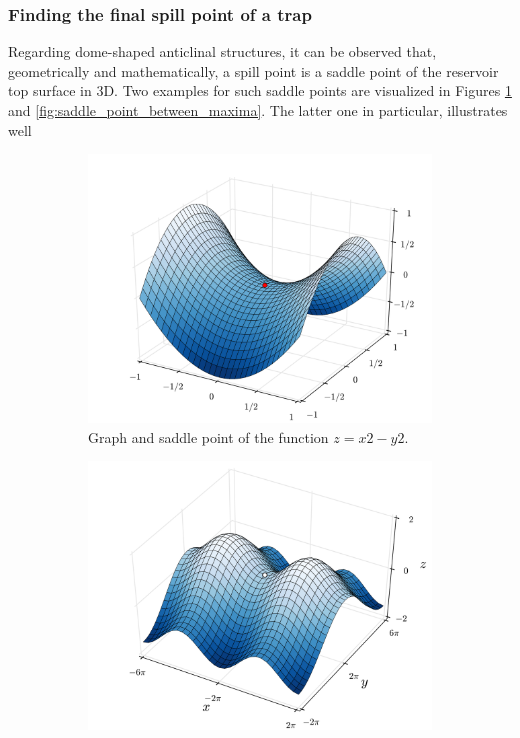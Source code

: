 			\subsubsection{Finding the final spill point of a trap} %
			Regarding dome-shaped anticlinal structures, it can be observed that, geometrically and mathematically, a spill point is a saddle point of the reservoir top surface in 3D. Two examples for such saddle points are visualized in Figures \ref{fig:saddle_point} and \ref{fig:saddle_point_between_maxima}. The latter one in particular, illustrates well 
			
			\begin{figure}[h]
				\begin{subfigure}{.5\textwidth}
					\centering
					\includegraphics[width=1\linewidth]{Figures/Saddle_point.png}
					\caption{Graph and saddle point of the function $z=x2−y2$.}\label{fig:saddle_point} 
				\end{subfigure}
				\begin{subfigure}{.5\textwidth}
					\centering
					\includegraphics[width=1\linewidth]{Figures/Saddle_Point_between_maxima.png}

\end{subfigure}
\end{figure}
